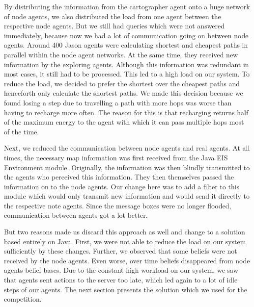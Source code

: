 By distributing the information from the cartographer agent onto a huge network of node agents, we also distributed the load from one agent between the respective node agents.
But we still had queries which were not answered immediately, because now we had a lot of communication going on between node agents.
Around 400 Jason agents were calculating shortest and cheapest paths in parallel within the node agent networks.
At the same time, they received new information by the exploring agents.
Although this information was redundant in most cases, it still had to be processed.
This led to a high load on our system.
To reduce the load, we decided to prefer the shortest over the cheapest paths and henceforth only calculate the shortest paths.
We made this decision because we found losing a step due to travelling a path with more hops was worse than having to recharge more often.
The reason for this is that recharging returns half of the maximum energy to the agent with which it can pass multiple hops most of the time.

Next, we reduced the communication between node agents and real agents.
At all times, the necessary map information was first received from the Java EIS Environment module.
Originally, the information was then blindly transmitted to the agents who perceived this information.
They then themselves passed the information on to the node agents.
Our change here was to add a filter to this module which would only transmit new information and would send it directly to the respective note agents.
Since the message boxes were no longer flooded, communication between agents got a lot better.

But two reasons made us discard this approach as well and change to a solution based entirely on Java.
First, we were not able to reduce the load on our system sufficiently by these changes.
Further, we observed that some beliefs were not received by the node agents.
Even worse, over time beliefs disappeared from node agents belief bases.
Due to the constant high workload on our system, we saw that agents sent actions to the server too late, which led again to a lot of idle steps of our agents.
The next section presents the solution which we used for the competition.

